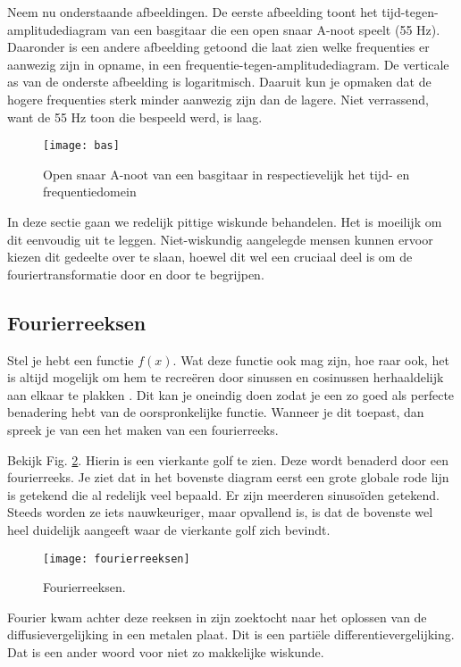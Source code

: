 \documentclass[11pt,fleqn]{book} %
\begin{document}
Neem nu onderstaande afbeeldingen. De eerste afbeelding toont het tijd-tegen-amplitudediagram van een basgitaar die een open snaar A-noot speelt (55 Hz). Daaronder is een andere afbeelding getoond die laat zien welke frequenties er aanwezig zijn in opname, in een frequentie-tegen-amplitudediagram. De verticale as van de onderste afbeelding is logaritmisch. Daaruit kun je opmaken dat de hogere frequenties sterk minder aanwezig zijn dan de lagere. Niet verrassend, want de 55 Hz toon die bespeeld werd, is laag.

\begin{figure}[h]
	\centering\texttt{[image: bas]}
	\caption{Open snaar A-noot van een basgitaar in respectievelijk het tijd- en frequentiedomein}
	\label{fig:bas}
\end{figure}

In deze sectie gaan we redelijk pittige wiskunde behandelen. Het is moeilijk om dit eenvoudig uit te leggen. Niet-wiskundig aangelegde mensen kunnen ervoor kiezen dit gedeelte over te slaan, hoewel dit wel een cruciaal deel is om de fouriertransformatie door en door te begrijpen.

\subsection{Fourierreeksen}
Stel je hebt een functie $f(x)$. Wat deze functie ook mag zijn, hoe raar ook, het is altijd mogelijk om hem te recreëren door sinussen en cosinussen herhaaldelijk aan elkaar te plakken \cite{fs}. Dit kan je oneindig doen zodat je een zo goed als perfecte benadering hebt van de oorspronkelijke functie. Wanneer je dit toepast, dan spreek je van een het maken van een fourierreeks.

Bekijk Fig. \ref{fig:fourierreeksen}. Hierin is een vierkante golf te zien. Deze wordt benaderd door een fourierreeks. Je ziet dat in het bovenste diagram eerst een grote globale rode lijn is getekend die al redelijk veel bepaald. Er zijn meerderen sinusoïden getekend. Steeds worden ze iets nauwkeuriger, maar opvallend is, is dat de bovenste wel heel duidelijk aangeeft waar de vierkante golf zich bevindt.

\begin{figure}[h]
	\centering\texttt{[image: fourierreeksen]}
	\caption{Fourierreeksen.}
	\label{fig:fourierreeksen}
\end{figure}

Fourier kwam achter deze reeksen in zijn zoektocht naar het oplossen van de diffusievergelijking in een metalen plaat. Dit is een partiële differentievergelijking. Dat is een ander woord voor niet zo makkelijke wiskunde.
\end{document}
